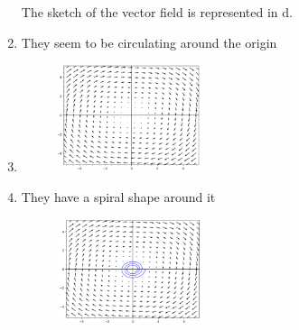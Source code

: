 \documentclass[12pt]{article}
\begin{document}
\begin{enumerate}[label=\alph*.]
    The sketch of the vector field is represented in d.
    \item They seem to be circulating around the origin
    \item \begin{figure}[!ht]
        \centering
        \includegraphics[width=0.4\textwidth]{vectorField.png} %
    \end{figure}
    \item They have a spiral shape around it
    \begin{figure}[!ht]
        \centering
        \includegraphics[width=0.4\textwidth]{vectorField2.png} %
    \end{figure}
\end{enumerate}
\end{document}
